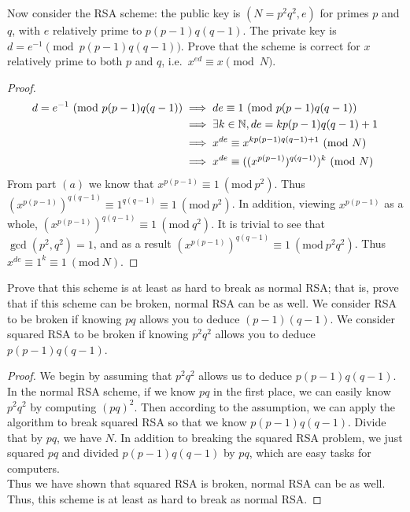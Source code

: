 \documentclass[11pt]{article}
\newcommand{\Mod}[1]{\ (\mathrm{mod}\ #1)}
\begin{document}
\begin{Parts}
    \Part Now consider the RSA scheme: the public key is $(N = p^2 q^2, e)$ for primes $p$ and $q$, 
          with $e$ relatively prime to $p(p-1)q(q-1)$. The private key is $d = e^{-1} \pmod{p(p-1)q(q-1)}$. 
          Prove that the scheme is correct for $x$ relatively prime to both $p$ and $q$, i.e.\ $x^{ed} \equiv x \pmod{N}$.
    \begin{Answer}
        \begin{proof}
            \begin{align*}
                d = e^{-1} \Mod{p(p-1)q(q-1)} &\implies de \equiv 1 \Mod{p(p-1)q(q-1)} \\
                                              &\implies \exists k \in \N, de = kp(p-1)q(q-1) + 1 \\
                                              &\implies x^{de} \equiv x^{kp(p-1)q(q-1) + 1} \Mod{N} \\ 
                                              &\implies x^{de} \equiv ((x^{p(p-1)})^{q(q-1)})^k \Mod{N}
            \end{align*}
            From part $(a)$ we know that $x^{p(p-1)} \equiv 1 \Mod{p^2}$. Thus $(x^{p(p-1)})^{q(q-1)} \equiv 1^{q(q-1)} \equiv 1 \Mod{p^2}$. 
            In addition, viewing $x^{p(p-1)}$ as a whole, $(x^{p(p-1)})^{q(q-1)} \equiv 1 \Mod{q^2}$. It is trivial to see that $\gcd(p^2, q^2) = 1$, 
            and as a result $(x^{p(p-1)})^{q(q-1)} \equiv 1 \Mod{p^2q^2}$. Thus $x^{de} \equiv 1^k \equiv 1 \Mod{N}$. 
        \end{proof}
    \end{Answer}

    \newpage
    \Part Prove that this scheme is at least as hard to break as normal RSA; that is, prove that if this scheme can be broken, 
          normal RSA can be as well. We consider RSA to be broken if knowing $pq$ allows you to deduce $(p - 1)(q - 1)$.
          We consider squared RSA to be broken if knowing $p^2q^2$ allows you to deduce $p(p - 1)q(q - 1)$.
    \begin{Answer}
        \begin{proof}
            We begin by assuming that $p^2q^2$ allows us to deduce $p(p-1)q(q-1)$. \\
            In the normal RSA scheme, if we know $pq$ in the first place, we can easily know $p^2q^2$ by computing $(pq)^2$. Then according to 
            the assumption, we can apply the algorithm to break squared RSA so that we know $p(p-1)q(q-1)$. Divide that by $pq$, we have $N$. 
            In addition to breaking the squared RSA problem, we just squared $pq$ and divided $p(p-1)q(q-1)$ by $pq$, which are easy tasks for
            computers. \\
            Thus we have shown that squared RSA is broken, normal RSA can be as well. Thus, this scheme is at least as hard to break as normal RSA. 
        \end{proof}
    \end{Answer}
\end{Parts}
\end{document}
